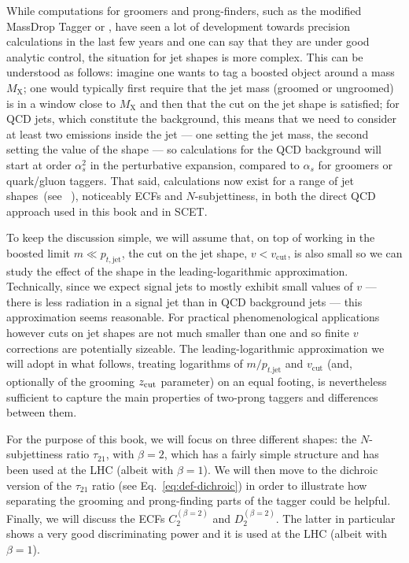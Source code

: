 While computations for groomers and prong-finders, such as the
modified MassDrop Tagger or \SD, have seen a lot of
development towards precision calculations in the last few years and
one can say that they are under good analytic control, the
situation for jet shapes is more complex.
%
This can be understood as follows: imagine one wants to tag a boosted
object around a mass $M_\text{X}$; one would typically first require that the jet
mass (groomed or ungroomed) is in a window close to $M_\text{X}$ and then
that the cut on the jet shape is satisfied; for QCD jets, which constitute the background, this means that we need to consider at least two emissions inside the jet --- one
setting the jet mass, the second setting the value of the shape --- so
calculations for the QCD background will start at order $\alpha_s^2$ in
the perturbative expansion, compared to $\alpha_s$ for groomers or
quark/gluon taggers.
%
That said, calculations now exist for a range of jet shapes~(see
\eg~\cite{Larkoski:2013eya,Larkoski:2014tva,Larkoski:2015kga,Dasgupta:2015lxh,Larkoski:2017iuy,Napoletano:2018ohv}),
noticeably ECFs and $N$-subjettiness, in both the direct QCD approach
used in this book and in SCET.

To keep the discussion simple, we will assume that, on top of working
in the boosted limit $m\ll p_{t,\text{jet}}$, the cut on the jet shape,
$v<v_\text{cut}$, is also small so we can study the effect of the
shape in the leading-logarithmic approximation.
%
Technically, since we expect signal jets to mostly exhibit  small values of $v$
--- \ie there is less radiation in a signal jet than in QCD background
jets --- this approximation seems reasonable. For practical
phenomenological applications however cuts on jet shapes are not much
smaller than one and so finite $v$ corrections are potentially sizeable.
%
The leading-logarithmic approximation we will adopt in what follows,
treating logarithms of $m/p_{t.\text{jet}}$ and $v_\text{cut}$ (and,
optionally of the grooming $z_{\text{cut}}$ parameter) on an equal footing, is
nevertheless sufficient to capture the main properties of two-prong
taggers and differences between them.

For the purpose of this book, we will focus on three different shapes: the
 $N$-subjettiness ratio $\tau_{21}$, with $\beta=2$, which has a fairly
simple structure and has been used at the LHC (albeit with $\beta=1$). We will then move to the dichroic version of the $\tau_{21}$ ratio (see Eq.~\eqref{eq:def-dichroic}) in order to illustrate how separating the
grooming and prong-finding parts of the tagger could be helpful.
Finally, we will discuss the ECFs $C_2^{(\beta=2)}$ and $D_2^{(\beta=2)}$. The latter in particular shows a very good discriminating power and  it is used at the LHC (albeit with $\beta=1$).

